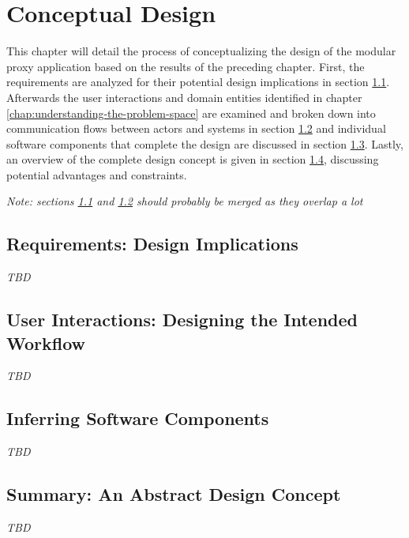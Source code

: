 \chapter{Conceptual Design}
\label{chap:conceptual-design}
This chapter will detail the process of conceptualizing the design of the modular proxy application based on the results of the preceding chapter. First, the requirements are analyzed for their potential design implications in section \ref{sec:req-design-implications}. Afterwards the user interactions and domain entities identified in chapter \ref{chap:understanding-the-problem-space} are examined and broken down into communication flows between actors and systems in section \ref{sec:user-interactions-designing-workflow} and individual software components that complete the design are discussed in section \ref{sec:inferring-software-components}. Lastly, an overview of the complete design concept is given in section \ref{sec:abstract-design-concept}, discussing potential advantages and constraints.

\emph{Note: sections \ref{sec:req-design-implications} and \ref{sec:user-interactions-designing-workflow} should probably be merged as they overlap a lot} %

\section{Requirements: Design Implications}
\label{sec:req-design-implications}
\emph{TBD} %

\section{User Interactions: Designing the Intended Workflow}
\label{sec:user-interactions-designing-workflow}
\emph{TBD} %

\section{Inferring Software Components}
\label{sec:inferring-software-components}
\emph{TBD} %

\section{Summary: An Abstract Design Concept}
\label{sec:abstract-design-concept}
\emph{TBD} %
